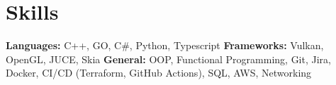\vspace{5 pt - 0.5 cm}
\section{Skills}
\begin{onecolentry}
    \textbf{Languages:} C++, GO, C\#, Python, Typescript \newline
    \textbf{Frameworks:} Vulkan, OpenGL, JUCE, Skia  \newline
    \textbf{General:} OOP, Functional Programming, Git, Jira, Docker, CI/CD (Terraform, GitHub Actions), SQL, AWS, Networking \newline
\end{onecolentry} 